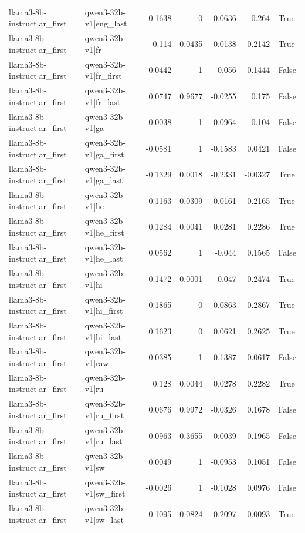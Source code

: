 \begin{table}
\begin{tabular}{l l r r r r l}
llama3-8b-instruct|ar_first & qwen3-32b-v1|eng_last & 0.1638 & 0 & 0.0636 & 0.264 & True \\
llama3-8b-instruct|ar_first & qwen3-32b-v1|fr & 0.114 & 0.0435 & 0.0138 & 0.2142 & True \\
llama3-8b-instruct|ar_first & qwen3-32b-v1|fr_first & 0.0442 & 1 & -0.056 & 0.1444 & False \\
llama3-8b-instruct|ar_first & qwen3-32b-v1|fr_last & 0.0747 & 0.9677 & -0.0255 & 0.175 & False \\
llama3-8b-instruct|ar_first & qwen3-32b-v1|ga & 0.0038 & 1 & -0.0964 & 0.104 & False \\
llama3-8b-instruct|ar_first & qwen3-32b-v1|ga_first & -0.0581 & 1 & -0.1583 & 0.0421 & False \\
llama3-8b-instruct|ar_first & qwen3-32b-v1|ga_last & -0.1329 & 0.0018 & -0.2331 & -0.0327 & True \\
llama3-8b-instruct|ar_first & qwen3-32b-v1|he & 0.1163 & 0.0309 & 0.0161 & 0.2165 & True \\
llama3-8b-instruct|ar_first & qwen3-32b-v1|he_first & 0.1284 & 0.0041 & 0.0281 & 0.2286 & True \\
llama3-8b-instruct|ar_first & qwen3-32b-v1|he_last & 0.0562 & 1 & -0.044 & 0.1565 & False \\
llama3-8b-instruct|ar_first & qwen3-32b-v1|hi & 0.1472 & 0.0001 & 0.047 & 0.2474 & True \\
llama3-8b-instruct|ar_first & qwen3-32b-v1|hi_first & 0.1865 & 0 & 0.0863 & 0.2867 & True \\
llama3-8b-instruct|ar_first & qwen3-32b-v1|hi_last & 0.1623 & 0 & 0.0621 & 0.2625 & True \\
llama3-8b-instruct|ar_first & qwen3-32b-v1|raw & -0.0385 & 1 & -0.1387 & 0.0617 & False \\
llama3-8b-instruct|ar_first & qwen3-32b-v1|ru & 0.128 & 0.0044 & 0.0278 & 0.2282 & True \\
llama3-8b-instruct|ar_first & qwen3-32b-v1|ru_first & 0.0676 & 0.9972 & -0.0326 & 0.1678 & False \\
llama3-8b-instruct|ar_first & qwen3-32b-v1|ru_last & 0.0963 & 0.3655 & -0.0039 & 0.1965 & False \\
llama3-8b-instruct|ar_first & qwen3-32b-v1|sw & 0.0049 & 1 & -0.0953 & 0.1051 & False \\
llama3-8b-instruct|ar_first & qwen3-32b-v1|sw_first & -0.0026 & 1 & -0.1028 & 0.0976 & False \\
llama3-8b-instruct|ar_first & qwen3-32b-v1|sw_last & -0.1095 & 0.0824 & -0.2097 & -0.0093 & True \\

\end{tabular}
\end{table}

